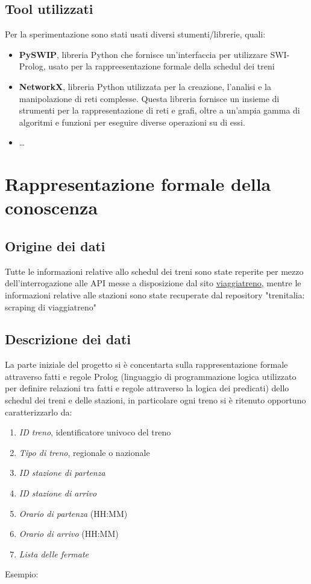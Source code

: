 \documentclass[italian,12pt,a4paper]{article}
\begin{document}
	
	\subsection{Tool utilizzati}
	Per la sperimentazione sono stati usati diversi stumenti/librerie, quali:
	
		\begin{itemize}
			\item \textbf{PySWIP}, libreria Python che fornisce un'interfaccia per utilizzare SWI-Prolog, usato per la rappreesentazione formale della schedul dei treni
			\item \textbf{NetworkX}, libreria Python utilizzata per la creazione, l'analisi e la manipolazione di reti complesse. Questa libreria fornisce un insieme di strumenti per la rappresentazione di reti e grafi, oltre a un'ampia gamma di algoritmi e funzioni per eseguire diverse operazioni su di essi.
			\item \dots
		\end{itemize}

	\section{Rappresentazione formale della conoscenza}
	
	\subsection{Origine dei dati}
	Tutte le informazioni relative allo schedul dei treni sono state reperite per mezzo dell'interrogazione alle API messe a disposizione dal sito \href{http://www.viaggiatreno.it/infomobilita/index.jsp}{viaggiatreno}, mentre le informazioni relative alle stazioni sono state recuperate dal repository "trenitalia: scraping di viaggiatreno" \cite{dati_stazioni}
	
	\subsection{Descrizione dei dati}
	La parte iniziale del progetto si è concentarta sulla rappresentazione formale attraverso fatti e regole Prolog (linguaggio di programmazione logica utilizzato per definire relazioni tra fatti e regole attraverso la logica dei predicati) dello schedul dei treni e delle stazioni, in particolare ogni treno si è ritenuto opportuno caratterizzarlo da:
	
		\begin{enumerate}
			\item \textit{ID treno}, identificatore univoco del treno
			\item \textit{Tipo di treno}, regionale o nazionale
			\item \textit{ID stazione di partenza}
			\item \textit{ID stazione di arrivo}
			\item\textit{ Orario di partenza} (HH:MM)
			\item \textit{Orario di arrivo} (HH:MM)
			\item \textit{Lista delle fermate}
		\end{enumerate}
		Esempio:
		
\end{document}
